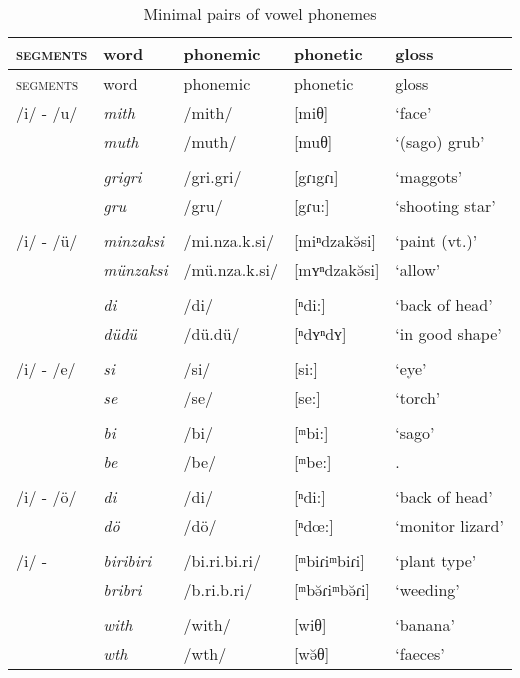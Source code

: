 \begin{longtable} {lllll}
\caption{Minimal pairs of vowel phonemes}
\label{minpairvow}\\
		\lsptoprule
		\textsc{segments}&{word}&{phonemic}&{phonetic}&{gloss}\\ \midrule
 		\textsc{segments}&{word}&{phonemic}&{phonetic}&{gloss}\\ \midrule
		/i/ - /u/ & \emph{mith} & /mith/ & [miθ] & `face'\\
		& \emph{muth} & /muth/ & [muθ] & `(sago) grub'\\
		&&&&\\
		& \emph{grigri} & /gri.gri/ & [{\ᵑ}gɾı{\ᵑ}gɾı] & `maggots'\\
		& \emph{gru} & /gru/ & [{\ᵑ}gɾu:] & `shooting star'\\
		&&&&\\
		/i/ - /ü/ & \emph{minzaksi} &/mi.nza.k.si/ & [miⁿdzakə̆si] & `paint (vt.)'\\
		& \emph{münzaksi} &/mü.nza.k.si/ & [mʏⁿdzakə̆si] & `allow'\\
		&&&&\\
		& \emph{di} & /di/ & [ⁿdi:] & `back of head'\\
		& \emph{düdü} & /dü.dü/ & [ⁿdʏⁿdʏ] & `in good shape'\\
		&&&&\\
		/i/ - /e/ & \emph{si} & /si/ & [si:] & `eye'\\
		& \emph{se}	& /se/ & [se:] & `torch'\\
		&&&&\\
		& \emph{bi} & /bi/ & [ᵐbi:] & `sago'\\
		& \emph{be}	& /be/ & [ᵐbe:] & \Ssg.\Erg{}\\
		&&&&\\
		/i/ - /ö/ & \emph{di} & /di/ & [ⁿdi:] & `back of head'\\
		& \emph{dö} & /dö/ & [ⁿdœ:] & `monitor lizard'\\
		&&&&\\
		/i/ - \Zero{} & \emph{biribiri} & /bi.ri.bi.ri/ & [ᵐbiɾiᵐbiɾi] & `plant type'\\
		& \emph{bribri} & /b.ri.b.ri/&   [ᵐbə̆ɾiᵐbə̆ɾi] & `weeding'\\
		&&&&\\
		& \emph{with} & /with/ &[wiθ] & `banana'\\
		& \emph{wth} & /wth/ &[wə̆θ]&	`faeces'\\

\end{longtable}
